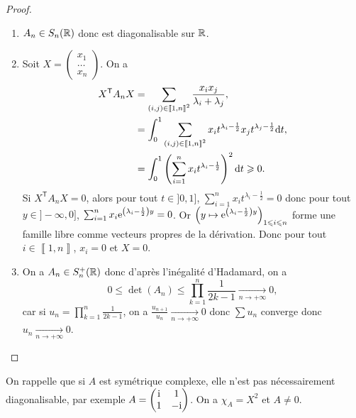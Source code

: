 \documentclass[12pt]{article}
\begin{document}
\begin{proof}
	\phantom{}
	\begin{enumerate}
		\item $A_n\in S_n(\mathbb{R})$ donc est diagonalisable sur $\mathbb{R}$.
		\item Soit $X=\begin{pmatrix}
			x_1\\ \dots\\ x_n
		\end{pmatrix}$. On a 
		\begin{align}
			X^{\mathsf{T}}A_n X
			&=\sum_{(i,j)\in\left\llbracket1,n\right\rrbracket^{2}}\frac{x_i x_j}{\lambda_i+\lambda_j},\\
			&=\int_{0}^{1}\sum_{(i,j)\in\left\llbracket1,n\right\rrbracket^{2}}x_{i}t^{\lambda_{i}-\frac{1}{2}}x_jt^{\lambda_{j}-\frac{1}{2}}\mathrm{d} t,\\
			&=\int_{0}^{1}\left(\sum_{i=1}^{n}x_it^{\lambda_{i}-\frac{1}{2}}\right)^{2}\mathrm{d} t\geqslant0.
		\end{align}
		Si $X^{\mathsf{T}}A_nX=0$, alors pour tout $t\in]0,1]$, $\sum_{i=1}^{n}x_it^{\lambda_i-\frac{1}{2}}=0$ donc pour tout $y\in]-\infty,0]$, $\sum_{i=1}^{n}x_i \mathrm{e}^{\left(\lambda_{i}-\frac{1}{2}\right)y}=0$. Or $\left(y\mapsto\mathrm{e}^{\left(\lambda_{i}-\frac{1}{2}\right)y}\right)_{1\leqslant i\leqslant n}$ forme une famille libre comme vecteurs propres de la dérivation. Donc pour tout $i\in\left\llbracket1,n\right\rrbracket$, $x_i=0$ et $X=0$.

		\item On a $A_n\in S_n^{+}(\mathbb{R})$ donc d'après l'inégalité d'Hadamard, on a 
		\begin{equation}
			0\leqslant\det(A_n)\leqslant\prod_{k=1}^{n}\frac{1}{2k-1}\xrightarrow[n\to+\infty]{}0,
		\end{equation}
		car si $u_n=\prod_{k=1}^{n}\frac{1}{2k-1}$, on a $\frac{u_{n+1}}{u_{n}}\xrightarrow[n\to+\infty]{}0$ donc $\sum u_n$ converge donc $u_n\xrightarrow[n\to+\infty]{}0$.
	\end{enumerate}
\end{proof}

\begin{remark}
	On rappelle que si $A$ est symétrique complexe, elle n'est pas nécessairement diagonalisable, par exemple $A=\begin{pmatrix}
		\mathrm{i} &1\\ 1 &-\mathrm{i}
	\end{pmatrix}$. On a $\chi_{A}=X^{2}$ et $A\neq 0$.
\end{remark}
\end{document}
